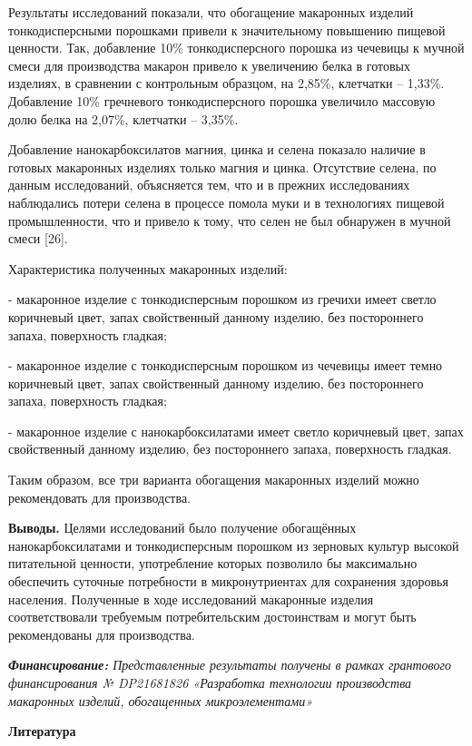 Результаты исследований показали, что обогащение макаронных изделий
тонкодисперсными порошками привели к значительному повышению пищевой
ценности. Так, добавление 10\% тонкодисперсного порошка из чечевицы к
мучной смеси для производства макарон привело к увеличению белка в
готовых изделиях, в сравнении с контрольным образцом, на 2,85\%,
клетчатки -- 1,33\%. Добавление 10\% гречневого тонкодисперсного порошка
увеличило массовую долю белка на 2,07\%, клетчатки -- 3,35\%.

Добавление нанокарбоксилатов магния, цинка и селена показало наличие в
готовых макаронных изделиях только магния и цинка. Отсутствие селена, по
данным исследований, объясняется тем, что и в прежних исследованиях
наблюдались потери селена в процессе помола муки и в технологиях пищевой
промышленности, что и привело к тому, что селен не был обнаружен в
мучной смеси {[}26{]}.

Характеристика полученных макаронных изделий:

- макаронное изделие с тонкодисперсным порошком из гречихи имеет светло
коричневый цвет, запах свойственный данному изделию, без постороннего
запаха, поверхность гладкая;

- макаронное изделие с тонкодисперсным порошком из чечевицы имеет темно
коричневый цвет, запах свойственный данному изделию, без постороннего
запаха, поверхность гладкая;

- макаронное изделие с нанокарбоксилатами имеет светло коричневый цвет,
запах свойственный данному изделию, без постороннего запаха, поверхность
гладкая.

Таким образом, все три варианта обогащения макаронных изделий можно
рекомендовать для производства.

{\bfseries Выводы.} Целями исследований было получение обогащённых
нанокарбоксилатами и тонкодисперсным порошком из зерновых культур
высокой питательной ценности, употребление которых позволило бы
максимально обеспечить суточные потребности в микронутриентах для
сохранения здоровья населения. Полученные в ходе исследований макаронные
изделия соответствовали требуемым потребительским достоинствам и могут
быть рекомендованы для производства.

\emph{{\bfseries Финансирование:} Представленные результаты получены в
рамках грантового финансирования № DP21681826 «Разработка технологии
производства макаронных изделий, обогащенных микроэлементами»}



\begin{center}
  {\bfseries Литература}
  \end{center}

